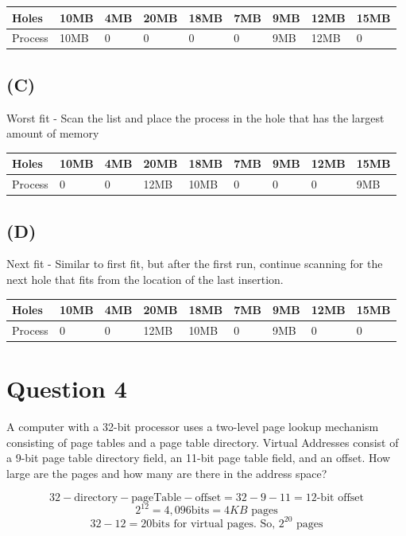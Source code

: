 \documentclass[12pt]{article}
\begin{document}
	\begin{tabular}[c]{| l | l | l | l | l | l | l | l | l |}
		\hline
		Holes & 10MB & 4MB & 20MB & 18MB & 7MB & 9MB & 12MB & 15MB \\
		\hline
		Process & 10MB & 0 & 0 & 0 & 0 & 9MB & 12MB & 0 \\
		\hline
	\end{tabular}
	
	\subsection*{(C)}	
	Worst fit - Scan the list and place the process in the hole that has the largest amount of memory
	
	\begin{tabular}[c]{| l | l | l | l | l | l | l | l | l |}
		\hline
		Holes & 10MB & 4MB & 20MB & 18MB & 7MB & 9MB & 12MB & 15MB \\
		\hline
		Process & 0 & 0 & 12MB & 10MB & 0 & 0 & 0 & 9MB \\
		\hline
	\end{tabular}
	
	\subsection*{(D)}
	Next fit - Similar to first fit, but after the first run, continue scanning for the next hole that fits from the location of the last insertion.
	
	\begin{tabular}[c]{| l | l | l | l | l | l | l | l | l |}
		\hline
		Holes & 10MB & 4MB & 20MB & 18MB & 7MB & 9MB & 12MB & 15MB \\
		\hline
		Process & 0 & 0 & 12MB & 10MB & 0 & 9MB & 0 & 0 \\
		\hline
	\end{tabular}
	
	\section*{Question 4}
	A computer with a 32-bit processor uses a two-level page lookup mechanism
	consisting of page tables and a page table directory. Virtual Addresses consist of a 9-bit page table
	directory field, an 11-bit page table field, and an offset. How large are the pages and how many are
	there in the address space?
	
	$$ 32 - \text{directory} - \text{pageTable} - \text{offset} = 32 - 9 - 11 = 12\text{-bit offset}$$
	$$ 2^{12} = 4,096 \text{bits} = 4KB \text{ pages} $$
	$$ 32 - 12 = 20 \text{bits for virtual pages. So, } 2^{20} \text{ pages} $$
	
\end{document}
